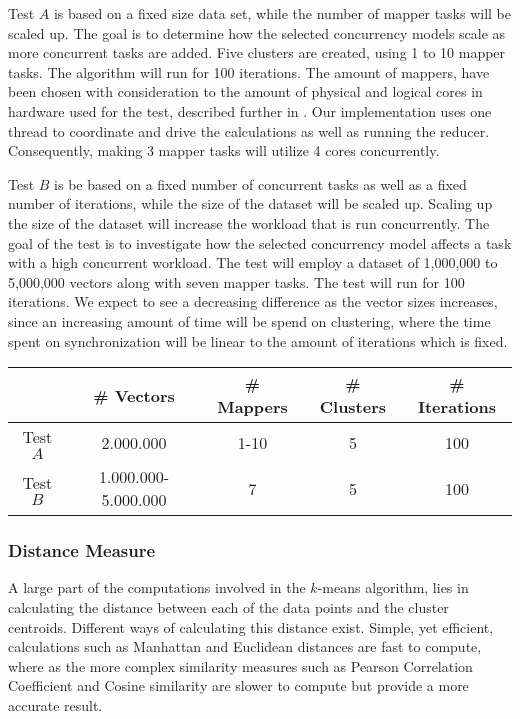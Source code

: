 Test $A$ is based on a fixed size data set, while the number of mapper tasks will be scaled up. The goal is to determine how the selected concurrency models scale as more concurrent tasks are added. Five clusters are created, using 1 to 10 mapper tasks. The algorithm will run for 100 iterations. The amount of mappers, have been chosen with consideration to the amount of physical and logical cores in hardware used for the test, described further in . Our implementation uses one thread to coordinate and drive the calculations as well as running the reducer. Consequently, making 3 mapper tasks will utilize 4 cores concurrently.

Test $B$ is be based on a fixed number of concurrent tasks as well as a fixed number of iterations, while the size of the dataset will be scaled up. Scaling up the size of the dataset will increase the workload that is run concurrently. The goal of the test is to investigate how the selected concurrency model affects a task with a high concurrent workload. The test will employ a dataset of 1,000,000 to 5,000,000 vectors along with seven mapper tasks. The test will run for 100 iterations. We expect to see a decreasing difference as the vector sizes increases, since an increasing amount of time will be spend on clustering, where the time spent on synchronization will be linear to the amount of iterations which is fixed.

\begin{center}
\begin{table}[h]
\centering
\begin{tabular}{c|cccc}
       & \# Vectors        & \# Mappers			 	& \# Clusters & \# Iterations \\ \hline
Test $A$ & 2.000.000            & 1-10        			& 5           & 100      \\
Test $B$ & 1.000.000-5.000.000  & 7          			& 5           & 100
\end{tabular}
\end{table}
 \label{tab:test_description_work_intensive} 
\end{center}

\subsubsection{Distance Measure}
A large part of the computations involved in the $k$-means algorithm, lies in calculating the distance between each of the data points and the cluster centroids. Different ways of calculating this distance exist. Simple, yet efficient, calculations such as Manhattan and Euclidean\cite[p. 41]{amatriain2011data} distances are fast to compute, where as the more complex similarity measures such as Pearson Correlation Coefficient and Cosine similarity\cite[p. 42]{amatriain2011data}\cite{breese1998empirical} are slower to compute but provide a more accurate result.

